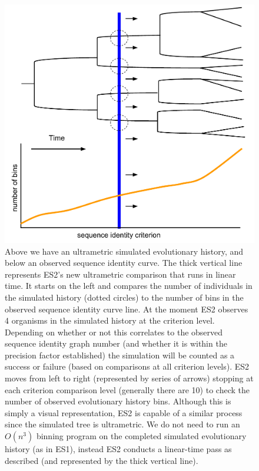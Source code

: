 \begin{figure}[h!]
\centering
\includegraphics[scale=0.6]{images/ES2-Illustration}
\caption[Illustration of the new ES2 algorithm.]{Above we have an ultrametric simulated evolutionary history, and below an observed sequence identity curve. The thick vertical line represents ES2's new ultrametric comparison that runs in linear time. It starts on the left and compares the number of individuals in the simulated history (dotted circles) to the number of bins in the observed sequence identity curve line. At the moment ES2 observes 4 organisms in the simulated history at the criterion level. Depending on whether or not this correlates to the observed sequence identity graph number (and whether it is within the precision factor established) the simulation will be counted as a success or failure (based on comparisons at all criterion levels). ES2 moves from left to right (represented by series of arrows) stopping at each criterion comparison level (generally there are 10) to check the number of observed evolutionary history bins. Although this is simply a visual representation, ES2 is capable of a similar process since the simulated tree is ultrametric. We do not need to run an $O(n^3)$ binning program on the completed simulated evolutionary history (as in ES1), instead ES2 conducts a linear-time pass as described (and represented by the thick vertical line).}
\label{fig:ES2Explain}
\end{figure}

